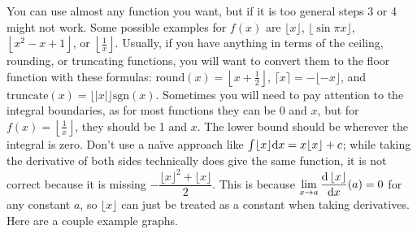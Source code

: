 \documentclass[12pt]{article}
\begin{document}
	\indent\indent You can use almost any function you want, but if it is too general steps 3 or 4
	might not work. Some possible examples for $f(x)$ are $\lfloor x\rfloor$, $\lfloor\sin\pi x
	\rfloor$, $\left\lfloor x^2 - x + 1\right\rfloor$, or $\left\lfloor\frac 1x\right\rfloor$.
	Usually, if you have anything in terms of the ceiling, rounding, or truncating functions, you
	will want to convert them to the floor function with these formulas: $\text{round}(x)=\left
	\lfloor x+\frac12\right\rfloor$, $\lceil x\rceil=-\lfloor-x\rfloor$, and $\text{truncate}(x)=
	\lfloor|x|\rfloor\text{sgn}(x)$. Sometimes you will need to pay attention to the integral
	boundaries, as for most functions they can be 0 and $x$, but for $f(x)=\left\lfloor\frac 1x
	\right\rfloor$, they should be 1 and $x$. The lower bound should be wherever the integral is
	zero. Don't use a naïve approach like $\int\lfloor x\rfloor\text dx=x\lfloor x\rfloor+c$; while
	taking the derivative of both sides technically does give the same function, it is not correct
	because it is missing $-\dfrac{\lfloor x\rfloor^2+\lfloor x\rfloor}2$. This is because
	$\displaystyle\lim_{x\to a}\frac{\text d\,\lfloor x\rfloor}{\text dx}(a)=0$ for any constant
	$a$, so $\lfloor x\rfloor$ can just be treated as a constant when taking derivatives. Here are
	a couple example graphs.
\end{document}
